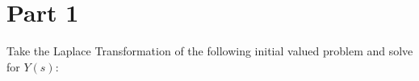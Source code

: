 \documentclass{article}
\begin{document}
\newcommand{\hr}{\par\noindent\rule{\textwidth}{0.4pt}}

\newcommand{\bc}[1]{
	\begin{equation*}
		\begin{boxed}
			{#1}
		\end{boxed}
	\end{equation*}
}

\newcommand{\cond}[2]{
	\ifmmode
		{#1} \quad {#2}
	\else
		$$ {#1} \quad {#2} $$
	\fi
}

\newcommand{\matr}[1]{
	\ifmmode \bm{#1}
	\else \textit{\textbf{#1}}
	\fi
}
\newcommand{\vect}[1]{
	\ifmmode \mathbf{#1}
	\else \textbf{#1}
	\fi
}

\newcommand{\lap}{\mathcal{L}}
\newcommand{\ilap}{\mathcal{L}^{-1}}

\tableofcontents

\section{Part 1}

Take the Laplace Transformation of the following initial valued problem and solve for $ Y(s) $:
\end{document}
